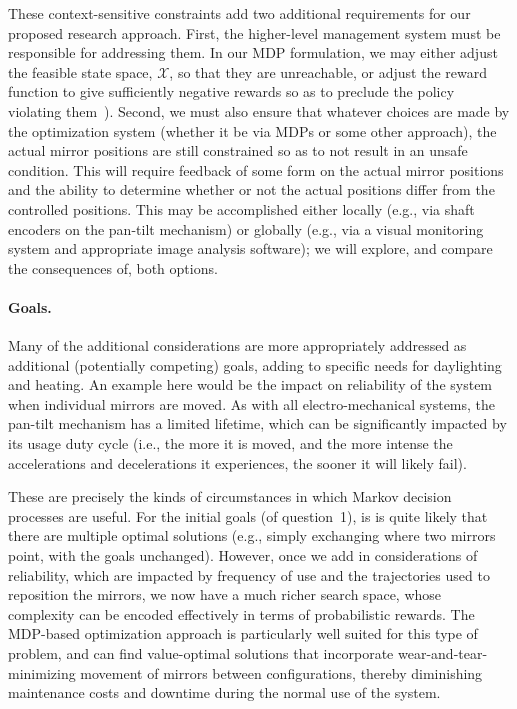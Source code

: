 These context-sensitive constraints add two additional requirements for
our proposed research approach.
First, the higher-level management system must be responsible for addressing them.
In our MDP formulation, we may either adjust the feasible state space, $\mathcal{X}$,
so that they are unreachable, or adjust the reward function to give sufficiently 
negative rewards so as to preclude the policy violating them~\cite{tblwgs11,tggs10}).
Second, we must also ensure that whatever choices are made by the optimization
system (whether it be via MDPs or some other approach), the actual
mirror positions are still constrained so as to not result in an
unsafe condition.  This will require feedback of some form on the actual
mirror positions and the ability to determine whether or not the actual
positions differ from the controlled positions.  This may be accomplished
either locally (e.g., via shaft encoders on the pan-tilt mechanism) or
globally (e.g., via a visual monitoring system and appropriate image analysis
software); we will explore, and compare the consequences of, both options.

\paragraph{Goals.}
Many of the additional considerations are more appropriately addressed as
additional (potentially competing) goals, adding to specific needs for
daylighting and heating.  An example here would be the
impact on reliability of the system when individual mirrors are moved.  As
with all electro-mechanical systems, the pan-tilt mechanism has a limited
lifetime, which can be significantly impacted by its usage duty cycle
(i.e., the more it is moved, and the more intense the accelerations and decelerations
it experiences, the sooner it will likely fail).

These are precisely the kinds of circumstances in which Markov decision
processes are useful. For the initial goals (of question~1), is is quite
likely that there are multiple optimal solutions (e.g., simply exchanging
where two mirrors point, with the goals unchanged).  However,
once we add in considerations of reliability, which are impacted by
frequency of use and the trajectories used to reposition the mirrors, 
we now have a much richer search space, whose complexity can be encoded
effectively in terms of probabilistic rewards.
The MDP-based optimization approach is particularly well suited for
this type of problem, and can find value-optimal solutions that incorporate
wear-and-tear-minimizing movement of mirrors between configurations, thereby 
diminishing maintenance costs and downtime during the normal use of the system.

